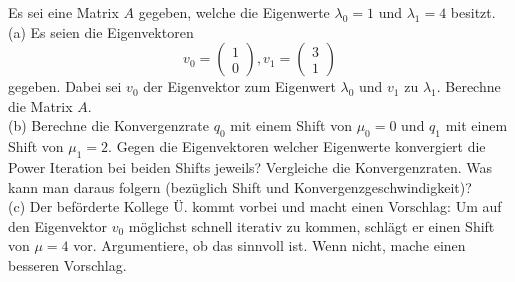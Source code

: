 \documentclass{scrartcl}
\begin{document}
	
	
	Es sei eine Matrix $A$ gegeben, welche die Eigenwerte $\lambda_0 = 1$ und $\lambda_1 = 4$ besitzt.
	\lbreak \\
	(a)
	Es seien die Eigenvektoren $$v_0 = \begin{pmatrix}
		1 \\ 0
	\end{pmatrix}, v_1 = \begin{pmatrix}
		3 \\ 1
	\end{pmatrix}$$ gegeben. Dabei sei $v_0$ der Eigenvektor zum Eigenwert $\lambda_0$ und $v_1$ zu $\lambda_1$. Berechne die Matrix $A$.
	 \lbreak
	\\
	(b)
	Berechne die Konvergenzrate $q_0$ mit einem Shift von $\mu_0 = 0$ und $q_1$ mit einem Shift von $\mu_1 = 2$.
	Gegen die Eigenvektoren welcher Eigenwerte konvergiert die Power Iteration bei beiden Shifts jeweils? Vergleiche die Konvergenzraten. Was kann man daraus folgern (bezüglich Shift und Konvergenzgeschwindigkeit)?
	 \lbreak
	\\
	(c)
	Der beförderte Kollege Ü. kommt vorbei und macht einen Vorschlag: Um auf den Eigenvektor $v_0$ möglichst schnell iterativ zu kommen, schlägt er einen Shift von $\mu = 4$ vor. Argumentiere, ob das sinnvoll ist. Wenn nicht, mache einen besseren Vorschlag.


	
\end{document}
